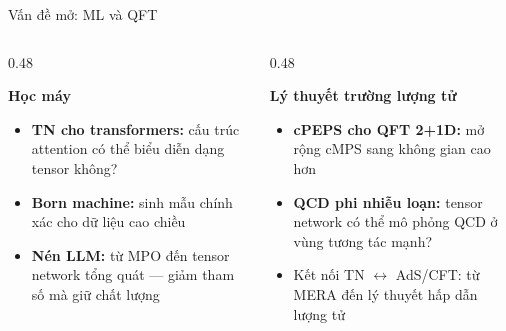 \documentclass[aspectratio=169, 11pt]{beamer}
\begin{document}
\begin{frame}{Vấn đề mở: ML và QFT}

\begin{columns}[T]
\begin{column}{0.48\textwidth}

\textcolor{qamber}{\textbf{Học máy}}\\[4pt]
{\small
\begin{itemize}
  \item \textbf{TN cho transformers:} cấu trúc attention có thể biểu diễn dạng tensor không?
  \item \textbf{Born machine:} sinh mẫu chính xác cho dữ liệu cao chiều
  \item \textbf{Nén LLM:} từ MPO đến tensor network tổng quát — giảm tham số mà giữ chất lượng
\end{itemize}}

\end{column}
\begin{column}{0.48\textwidth}

\textcolor{qpurple}{\textbf{Lý thuyết trường lượng tử}}\\[4pt]
{\small
\begin{itemize}
  \item \textbf{cPEPS cho QFT 2+1D:} mở rộng cMPS sang không gian cao hơn
  \item \textbf{QCD phi nhiễu loạn:} tensor network có thể mô phỏng QCD ở vùng tương tác mạnh?
  \item Kết nối TN $\leftrightarrow$ AdS/CFT: từ MERA đến lý thuyết hấp dẫn lượng tử
\end{itemize}}

\end{column}
\end{columns}

\end{frame}
\end{document}
